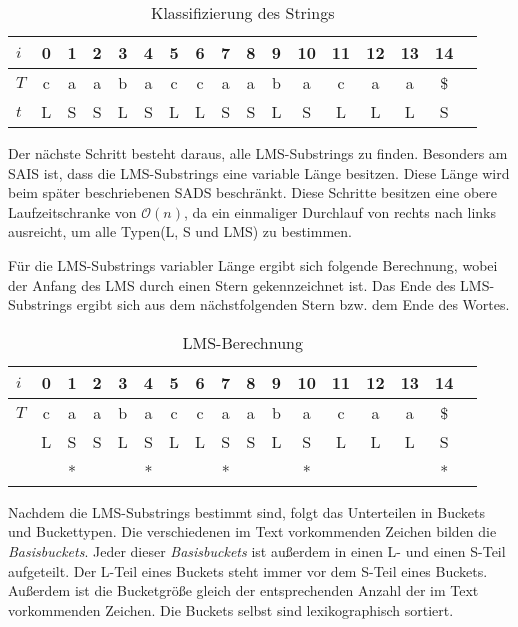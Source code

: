 \begin{table}[H]
\centering
  \begin{tabular}{ | l | c | c | c | c | c | c | c | c | c | c | c | c | c | c | c | c | }
    \hline
        $i$ & 0 & 1 & 2 & 3 & 4 & 5 & 6 & 7 & 8 & 9 & 10 & 11 & 12 & 13 & 14 \\ \hline
        $T$ & c & a & a & b & a & c & c & a & a & b & a & c & a & a & \$ \\ \hline
        $t$ & L & S & S & L & S & L & L & S & S & L & S & L & L & L & S \\
    \hline
  \end{tabular}
  \caption{Klassifizierung des Strings }
\end{table}
\bigskip
\noindent Der nächste Schritt besteht daraus, alle LMS-Substrings zu finden. Besonders am SAIS ist, dass die LMS-Substrings eine variable Länge besitzen. Diese Länge wird beim später beschriebenen SADS beschränkt. Diese Schritte besitzen eine obere Laufzeitschranke von $\mathcal{O}(n)$, da ein einmaliger Durchlauf von rechts nach links ausreicht, um alle Typen(L, S und LMS) zu bestimmen.

\noindent Für die LMS-Substrings variabler Länge ergibt sich folgende Berechnung, wobei der Anfang des LMS durch einen Stern gekennzeichnet ist. Das Ende des LMS-Substrings ergibt sich aus dem nächstfolgenden Stern bzw. dem Ende des Wortes.

\begin{table}[H]
\centering
  \begin{tabular}{ | l | c | c | c | c | c | c | c | c | c | c | c | c | c | c | c | c | }
    \hline
        $i$ & 0 & 1 & 2 & 3 & 4 & 5 & 6 & 7 & 8 & 9 & 10 & 11 & 12 & 13 & 14 \\ \hline
        $T$ & c & a & a & b & a & c & c & a & a & b & a & c & a & a & \$ \\ \hline
            & L & S & S & L & S & L & L & S & S & L & S & L & L & L & S \\ \hline
            &   & * &   &   & * &   &   & * &   &   & * &   &   &   & * \\
    \hline
  \end{tabular}
  \caption{LMS-Berechnung}
\end{table}
\bigskip
\noindent Nachdem die LMS-Substrings bestimmt sind, folgt das Unterteilen in Buckets und Buckettypen. Die verschiedenen im Text vorkommenden Zeichen bilden die  \textit{Basisbuckets}. Jeder dieser  \textit{Basisbuckets} ist außerdem in einen L- und einen S-Teil aufgeteilt. Der L-Teil eines Buckets steht immer vor dem S-Teil eines Buckets. Außerdem ist die Bucketgröße gleich der entsprechenden Anzahl der im Text vorkommenden Zeichen. Die Buckets selbst sind lexikographisch sortiert.

